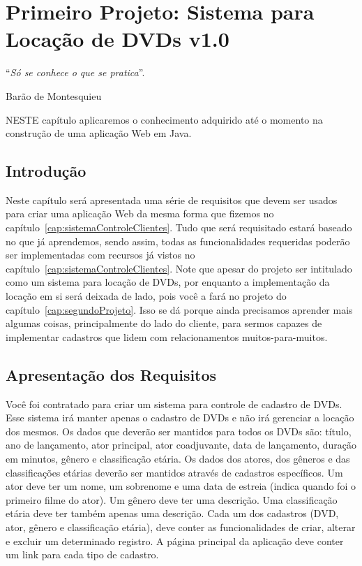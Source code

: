 \chapter{Primeiro Projeto: Sistema para Locação de DVDs v1.0}\label{cap:primeiroProjeto}
\epigraph{``\textit{Só se conhece o que se pratica}''.}{Barão de Montesquieu}

\lettrine[lines=4, lhang=0.1, lraise=0, loversize=0.2, findent=0.1em]{\textcolor{corTema}{N}}{ESTE} capítulo aplicaremos o conhecimento adquirido até o momento na construção de uma aplicação Web em Java.


\section{Introdução}

Neste capítulo será apresentada uma série de requisitos que devem ser usados para criar uma aplicação Web da mesma forma que fizemos no capítulo~\ref{cap:sistemaControleClientes}. Tudo que será requisitado estará baseado no que já aprendemos, sendo assim, todas as funcionalidades requeridas poderão ser implementadas com recursos já vistos no capítulo~\ref{cap:sistemaControleClientes}. Note que apesar do projeto ser intitulado como um sistema para locação de DVDs, por enquanto a implementação da locação em si será deixada de lado, pois você a fará no projeto do capítulo~\ref{cap:segundoProjeto}. Isso se dá porque ainda precisamos aprender mais algumas coisas, principalmente do lado do cliente, para sermos capazes de implementar cadastros que lidem com relacionamentos muitos-para-muitos.


\section{Apresentação dos Requisitos}

Você foi contratado para criar um sistema para controle de cadastro de DVDs. Esse sistema irá manter apenas o cadastro de DVDs e não irá gerenciar a locação dos mesmos. Os dados que deverão ser mantidos para todos os DVDs são: título, ano de lançamento, ator principal, ator coadjuvante, data de lançamento, duração em minutos, gênero e classificação etária. Os dados dos atores, dos gêneros e das classificações etárias deverão ser mantidos através de cadastros específicos. Um ator deve ter um nome, um sobrenome e uma data de estreia (indica quando foi o primeiro filme do ator). Um gênero deve ter uma descrição. Uma classificação etária deve ter também apenas uma descrição. Cada um dos cadastros (DVD, ator, gênero e classificação etária), deve conter as funcionalidades de criar, alterar e excluir um determinado registro. A página principal da aplicação deve conter um link para cada tipo de cadastro.



